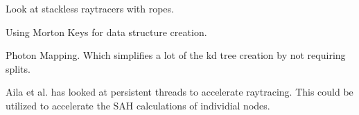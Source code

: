 
Look at stackless raytracers with ropes.

Using Morton Keys for data structure creation.

Photon Mapping. Which simplifies a lot of the kd tree creation by not
requiring splits.

Aila et al. has looked at persistent threads to
accelerate raytracing. This could be utilized to accelerate the SAH
calculations of individial nodes.

